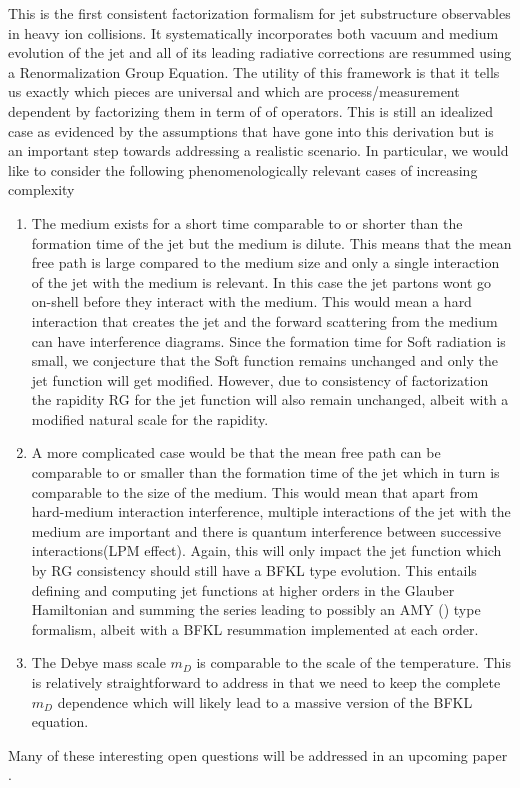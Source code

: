 \documentclass[letter,11pt]{article}
\begin{document}
This is the first consistent factorization formalism for jet substructure observables in heavy ion collisions.  It systematically incorporates both vacuum and medium evolution of the jet and all of its leading radiative corrections are resummed using a Renormalization Group Equation.  The utility of this framework is that it tells us exactly which pieces are universal and which are process/measurement dependent by factorizing them in term of of operators.
This is still an idealized case as evidenced by the assumptions that have gone into this derivation but is an important step towards addressing a realistic scenario. In particular, we would like to consider the following phenomenologically relevant cases of increasing complexity
\begin{enumerate}
\item The medium exists for a short time comparable to or shorter than the formation time of the jet but the medium is dilute. This means that the mean free path is large compared to the medium size and only a single interaction of the jet with the medium is relevant.  In this case the jet partons wont go on-shell before they interact with the medium. This would mean a hard interaction that creates the jet and the forward scattering from the medium can have interference diagrams. Since the formation time for Soft radiation is small, we conjecture that the Soft function remains unchanged and only the jet function will get modified. However, due to consistency of factorization the rapidity RG for the jet function will also remain unchanged, albeit with a modified natural scale for the rapidity. 

\item A more complicated case would be that the mean free path can be comparable to or smaller than the formation time of the jet which in turn is comparable to the size of the medium. This would mean that apart from hard-medium interaction interference,  multiple interactions of the jet with the medium are important and there is quantum interference between successive interactions(LPM effect). Again, this will only impact the jet function which by RG consistency should still have a BFKL type evolution. This entails defining and computing jet functions at higher orders in the Glauber Hamiltonian and summing the series leading to possibly an AMY (\cite{Arnold:2002ja}) type formalism, albeit with a BFKL resummation implemented at each order.

\item The Debye mass scale $m_D$ is comparable to the scale of the temperature. This is relatively straightforward  to address in that we need to keep the complete $m_D$ dependence which will likely lead to a massive version of the BFKL equation.

\end{enumerate}
Many of these interesting open questions will be addressed in an upcoming paper \cite{Varun}.
\end{document}
